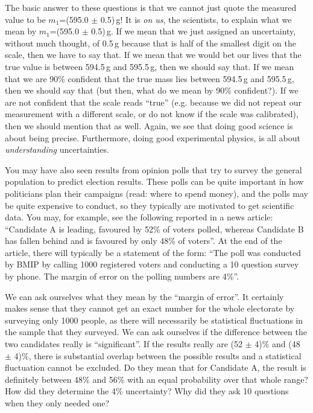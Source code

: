 The basic answer to these questions is that we cannot just quote the measured value to be $m_1$=(595.0 $\pm$ 0.5)\,g! It is \textit{on us}, the scientists, to explain what we mean by $m_1$=(595.0 $\pm$ 0.5)\,g. If we mean that we just assigned an uncertainty, without much thought, of 0.5\,g because that is half of the smallest digit on the scale, then we have to say that. If we mean that we would bet our lives that the true value is between 594.5\,g and 595.5\,g, then we should say that. If we mean that we are 90\% confident that the true mass lies between 594.5\,g and 595.5\,g, then we should say that (but then, what do we mean by 90\% confident?). If we are not confident that the scale reads ``true'' (e.g. because we did not repeat our measurement with a different scale, or do not know if the scale was calibrated), then we should mention that as well. Again, we see that doing good science is about being precise. Furthermore, doing good experimental physics, is all about \textit{understanding} uncertainties.

You may have also seen results from opinion polls that try to survey the general population to predict election results. These polls can be quite important in how politicians plan their campaigns (read: where to spend money), and the polls may be quite expensive to conduct, so they typically are motivated to get scientific data. You may, for example, see the following reported in a news article: ``Candidate A is leading, favoured by 52\% of voters polled, whereas Candidate B has fallen behind and is favoured by only 48\% of voters''. At the end of the article, there will typically be a statement of the form: ``The poll was conducted by BMIP by calling 1000 registered voters and conducting a 10 question survey by phone. The margin of error on the polling numbers are 4\%''.

We can ask ourselves what they mean by the ``margin of error''. It certainly makes sense that they cannot get an exact number for the whole electorate by surveying only 1000 people, as there will necessarily be statistical fluctuations in the sample that they surveyed. We can ask ourselves if the difference between the two candidates really is ``significant''. If the results really are (52 $\pm$ 4)\% and (48 $\pm$ 4)\%, there is substantial overlap between the possible results and a statistical fluctuation cannot be excluded. Do they mean that for Candidate A, the result is definitely between 48\% and 56\% with an equal probability over that whole range? How did they determine the 4\% uncertainty? Why did they ask 10 questions when they only needed one?

